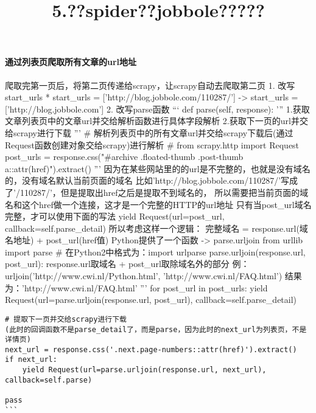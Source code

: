 \documentclass[11pt]{article}
\title{5.??spider??jobbole?????}
\begin{document}
    
    
    \maketitle
    
    

    
    \paragraph{通过列表页爬取所有文章的url地址}\label{ux901aux8fc7ux5217ux8868ux9875ux722cux53d6ux6240ux6709ux6587ux7ae0ux7684urlux5730ux5740}

爬取完第一页后，将第二页传递给scrapy，让scrapy自动去爬取第二页 1.
改写start\_urls * start\_urls = {[}'http://blog.jobbole.com/110287/'{]}
-\textgreater{} start\_urls = {[}'http://blog.jobbole.com'{]} 2.
改写parse函数 ``` def parse(self, response): '''
1.获取文章列表页中的文章url并交给解析函数进行具体字段解析
2.获取下一页的url并交给scrapy进行下载 ''' \#
解析列表页中的所有文章url并交给scrapy下载后(通过Request函数创建对象交给scrapy)进行解析
\# from scrapy.http import Request post\_urls = response.css("\#archive
.floated-thumb .post-thumb a::attr(href)").extract() '''
因为在某些网站里的的url是不完整的，也就是没有域名的，没有域名默认当前页面的域名
比如'http://blog.jobbole.com/110287/'写成了'/110287/'，但是提取出href之后是提取不到域名的，
所以需要把当前页面的域名和这个href做一个连接，这才是一个完整的HTTP的url地址
只有当post\_url域名完整，才可以使用下面的写法 yield
Request(url=post\_url, callback=self.parse\_detail)
所以考虑这样一个逻辑： 完整域名 = response.url(域名地址) +
post\_url(href值) Python提供了一个函数 -\textgreater{} parse.urljoin
from urllib import parse \# 在Python2中格式为：import urlparse
parse.urljoin(response.url, post\_url): response.url取域名 +
post\_url取除域名外的部分 例：urljoin('http://www.cwi.nl/Python.html',
'http://www.cwi.nl/FAQ.html') 结果为：'http://www.cwi.nl/FAQ.html' '''
for post\_url in post\_urls: yield
Request(url=parse.urljoin(response.url, post\_url),
callback=self.parse\_detail)

\begin{verbatim}
# 提取下一页并交给scrapy进行下载
(此时的回调函数不是parse_detail了，而是parse，因为此时的next_url为列表页，不是详情页)
next_url = response.css('.next.page-numbers::attr(href)').extract()
if next_url:
    yield Request(url=parse.urljoin(response.url, next_url), callback=self.parse)

pass
```
\end{verbatim}
\end{document}
